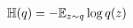 \documentclass[a4paper,10pt,onecolumn]{article}
\newcommand{\conj}[1]{\overline{#1}}
\begin{document}
\begin{align}
  \mathbb{H}(q)
    & = - \mathbb{E}_{z \sim q} \log{q(z)}
    \notag \\

\end{align}
\end{document}
